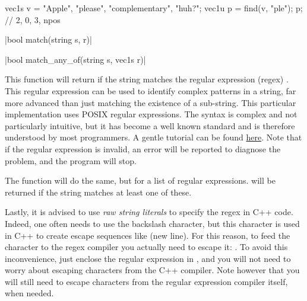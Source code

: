 \begin{example}
\begin{cppcode}
vec1s v = {"Apple", "please", "complementary", "huh?"};
vec1u p = find(v, "ple");
p; // {2, 0, 3, npos}
\end{cppcode}
\end{example}

\item \vectorfunc \cppinline|bool match(string s, r)| 

\vectorfunc \cppinline|bool match_any_of(string s, vec1s r)| 

This function will return \cpptrue if the string  matches the regular expression (regex) . This regular expression can be used to identify complex patterns in a string, far more advanced than just matching the existence of a sub-string. This particular implementation uses POSIX regular expressions. The syntax is complex and not particularly intuitive, but it has become a well known standard and is therefore understood by most programmers. A gentle tutorial can be found \href{http://www.zytrax.com/tech/web/regex.htm}{here}. Note that if the regular expression is invalid, an error will be reported to diagnose the problem, and the program will stop.

The function  will do the same, but for a list of regular expressions. \cpptrue will be returned if the string  matches at least one of these.

Lastly, it is advised to use \emph{raw string literals} to specify the regex in C++ code. Indeed, one often needs to use the backslash  character, but this character is used in C++ to create escape sequences like  (new line). For this reason, to feed the character  to the regex compiler you actually need to escape it: . To avoid this inconvenience, just enclose the regular expression in , and you will not need to worry about escaping characters from the C++ compiler. Note however that you will still need to escape characters from the regular expression compiler itself, when needed.

